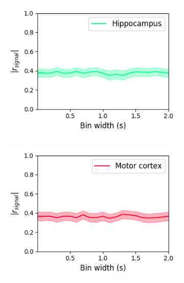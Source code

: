 \documentclass[a4paper,12pt]{article}
\theoremstyle{definition}
\begin{document}
\begin{figure}[p]
  \begin{subfigure}{0.5\textwidth}
    \centering
    \includegraphics[width=\textwidth]{figures/signal_linear_bin_width_correlations_hippocampus_0.png}
  \end{subfigure}
  \begin{subfigure}{0.5\textwidth}
    \centering
    \includegraphics[width=\textwidth]{figures/signal_linear_bin_width_correlations_motor_cortex_0.png}
  \end{subfigure}
  \begin{subfigure}{0.5\textwidth}
    \centering

\end{subfigure}
\end{figure}
\end{document}

